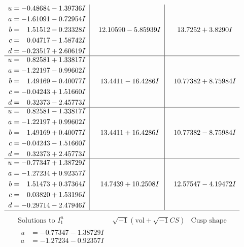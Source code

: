 \documentclass[1p]{elsarticle_modified}
\theoremstyle{definition}
\newcommand{\I}{\sqrt{-1}}
\begin{document}
$$\begin{array}{c|c|c}
\begin{aligned}
u &= -0.48684 - 1.39736 I \\
a &= -1.61091 - 0.72954 I \\
b &= \phantom{-}1.51512 - 0.23328 I \\
c &= \phantom{-}0.04717 - 1.58742 I \\
d &= -0.23517 + 2.60619 I\end{aligned}
 & \phantom{-}12.10590 - 5.85939 I & \phantom{-}13.7252 + 3.8290 I \\ \hline\begin{aligned}
u &= \phantom{-}0.82581 + 1.33817 I \\
a &= -1.22197 - 0.99602 I \\
b &= \phantom{-}1.49169 - 0.40077 I \\
c &= -0.04243 + 1.51660 I \\
d &= \phantom{-}0.32373 - 2.45773 I\end{aligned}
 & \phantom{-}13.4411 - 16.4286 I & \phantom{-}10.77382 + 8.75984 I \\ \hline\begin{aligned}
u &= \phantom{-}0.82581 - 1.33817 I \\
a &= -1.22197 + 0.99602 I \\
b &= \phantom{-}1.49169 + 0.40077 I \\
c &= -0.04243 - 1.51660 I \\
d &= \phantom{-}0.32373 + 2.45773 I\end{aligned}
 & \phantom{-}13.4411 + 16.4286 I & \phantom{-}10.77382 - 8.75984 I \\ \hline\begin{aligned}
u &= -0.77347 + 1.38729 I \\
a &= -1.27234 + 0.92357 I \\
b &= \phantom{-}1.51473 + 0.37364 I \\
c &= \phantom{-}0.03820 + 1.53196 I \\
d &= -0.29714 - 2.47946 I\end{aligned}
 & \phantom{-}14.7439 + 10.2508 I & \phantom{-}12.57547 - 4.19472 I\\
 \hline 
 \end{array}$$\newpage$$\begin{array}{c|c|c}  
\text{Solutions to }I^u_{1}& \I (\text{vol} + \sqrt{-1}CS) & \text{Cusp shape}\\
 \hline 
\begin{aligned}
u &= -0.77347 - 1.38729 I \\
a &= -1.27234 - 0.92357 I \\

\end{aligned}
\end{array}$$
\end{document}
